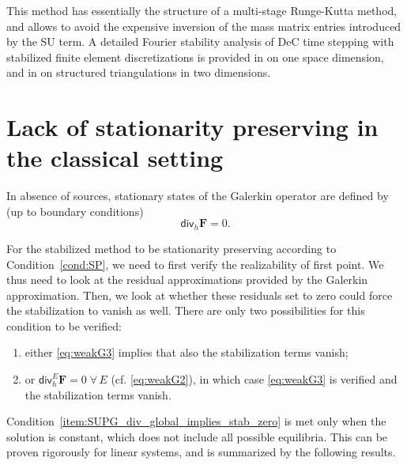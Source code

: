 \documentclass[a4paper,10pt]{article}
\begin{document}
This method has essentially the structure of a multi-stage Runge-Kutta method, and allows to avoid the expensive inversion of the   mass matrix entries introduced by the SU term. 
A detailed Fourier stability  analysis of DeC time stepping with    stabilized  finite element discretizations 
is provided in \cite{michel2021spectral} on one space dimension, and  in   \cite{michel2023spectral} on structured triangulations in two dimensions.   


 
%

 
\section{Lack of stationarity preserving in the classical setting}\label{sec:lack}

 In absence of sources, stationary states of the Galerkin operator are defined by (up to boundary conditions)
 \begin{equation}\label{eq:weakG3}
 \textsf{div}_h \mathbf{F}=0 .
 \end{equation}
 
 For the stabilized method to be stationarity preserving according to Condition~\ref{cond:SP},  we need to  first verify the realizability of first point. 
 We thus need to look at the residual approximations provided by the Galerkin approximation. Then, we look at whether these residuals set to zero could force the stabilization to vanish as well.
 There are only two  possibilities for this condition to be verified: 
  \begin{enumerate}[label={P.\arabic*}]
 	\item \label{item:SUPG_div_global_implies_stab_zero} either \eqref{eq:weakG3} implies that also the stabilization terms vanish;
  \item \label{item:cell_div_zero} or  $\mathsf{div}_h^E\mathbf{F} =0\;\forall \,E$ (cf. \eqref{eq:weakG2}), in which case  \eqref{eq:weakG3} is verified and  the stabilization terms vanish. 
  \end{enumerate}
Condition~\ref{item:SUPG_div_global_implies_stab_zero} is met only when the solution is constant, which does not include all possible equilibria. This  can be proven rigorously for linear systems,
and  is  summarized   by the following  results.
\end{document}
